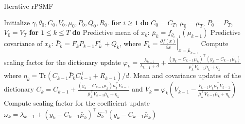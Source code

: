 \documentclass{mldsmsc}
\begin{document}
\begin{algorithm}[H]
\caption{Iterative rPSMF}
\begin{algorithmic}[1]
\State Initialize $\gamma, \theta_0, C_0, V_0, \mu_0, P_0, Q_0, R_0$.
\State \textbf{for} $i \geq 1$ \textbf{do}
\State \hspace{1em} $C_0 = C_T$, $\mu_0 = \mu_T$, $P_0 = P_T$, $V_0 = V_T$
\State \hspace{1em} \textbf{for} $1 \leq k \leq T$ \textbf{do}
\State \hspace{2em} Predictive mean of $x_k$:
\State \hspace{3em} $\bar{\mu}_k = f_{\theta_{i-1}}(\mu_{k-1})$
\State \hspace{2em} Predictive covariance of $x_k$:
\State \hspace{3em} $\bar{P}_k = F_k P_{k-1} F_k^\top + Q_k$, \hspace{1em} where \hspace{1em} $F_k = \left. \frac{\partial f(x)}{\partial x} \right|_{x=\bar{\mu}_{k-1}}$
\State \hspace{2em} Compute scaling factor for the dictionary update
\State \hspace{3em} $\varphi_k = \frac{\lambda_{k-1}}{\lambda_{k-1} + d} + \frac{(y_k - C_{k-1} \bar{\mu}_k)^\top (y_k - C_{k-1} \bar{\mu}_k)}{\bar{\mu}_k^\top V_{k-1} \bar{\mu}_k + \eta_k}$
\State \hspace{2em} where $\eta_k = \text{Tr}(C_{k-1} \bar{P}_k C_{k-1}^\top + R_{k-1}) / d$.
\State \hspace{2em} Mean and covariance updates of the dictionary
\State \hspace{3em} $C_k = C_{k-1} + \frac{(y_k - C_{k-1} \bar{\mu}_k) \bar{\mu}_k^\top V_{k-1}}{\bar{\mu}_k^\top V_{k-1} \bar{\mu}_k + \eta_k}$ and \hspace{1em} $V_k = \varphi_k \left( V_{k-1} - \frac{V_{k-1} \bar{\mu}_k \bar{\mu}_k^\top V_{k-1}}{\bar{\mu}_k^\top V_{k-1} \bar{\mu}_k + \eta_k} \right)$
\State \hspace{2em} Compute scaling factor for the coefficient update
\State \hspace{3em} $\omega_k = \lambda_{k-1} + (y_k - C_{k-1} \bar{\mu}_k)^\top S_k^{-1} (y_k - C_{k-1} \bar{\mu}_k)$


\end{algorithmic}
\end{algorithm}
\end{document}
